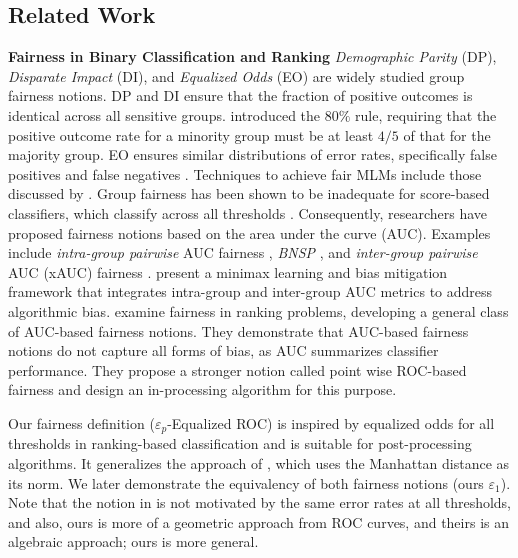 \documentclass{article}
\newcommand{\ourdef}{-Equalized ROC}
\begin{document}
\subsection{Related Work}
\textbf{Fairness in Binary Classification and Ranking}
\emph{Demographic Parity} (DP), \emph{Disparate Impact} (DI), and \emph{Equalized Odds} (EO) are widely studied group fairness notions. DP \citep{dwork12} and DI \citep{feldman15} ensure that the fraction of positive outcomes is identical across all sensitive groups. \cite{barocas16} introduced the $80\%$ rule, requiring that the positive outcome rate for a minority group must be at least $4/5$ of that for the majority group. EO \citep{hardt16} ensures similar distributions of error rates, specifically false positives and false negatives \citep{verma18}. Techniques to achieve fair MLMs include those discussed by \cite{padala21}.
Group fairness has been shown to be inadequate for score-based classifiers, which classify across all thresholds \citep{gorantla21}. Consequently, researchers have proposed fairness notions based on the area under the curve (AUC). Examples include \emph{intra-group pairwise} AUC fairness \citep{beutel19}, \emph{BNSP} \citep{borkan19}, and \emph{inter-group pairwise} AUC (xAUC) fairness \citep{kallus19}. \cite{yang2023minimax} present a minimax learning and bias mitigation framework that integrates intra-group and inter-group AUC metrics to address algorithmic bias.
\cite{vogel2021} examine fairness in ranking problems, developing a general class of AUC-based fairness notions. They demonstrate that AUC-based fairness notions do not capture all forms of bias, as AUC summarizes classifier performance. They propose a stronger notion called point wise ROC-based fairness and design an in-processing algorithm for this purpose.

Our fairness definition ($\varepsilon_p$\ourdef) is inspired by equalized odds for all thresholds in ranking-based classification and is suitable for post-processing algorithms. It generalizes the approach of \cite{chen2020towards}, which uses the Manhattan distance as its norm. We later demonstrate the equivalency of both fairness notions {(ours $\varepsilon_1$). Note that the notion in \cite{chen2020towards} is not motivated by the same error rates at all thresholds,  and also, ours is more of a geometric approach from ROC curves, and theirs is an algebraic approach; ours is more general.}
\end{document}
